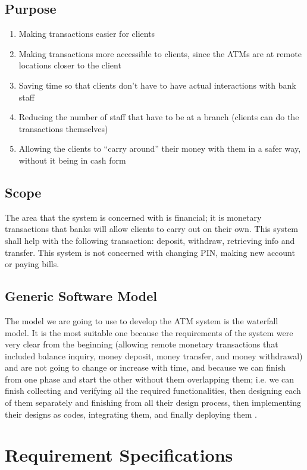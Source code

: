 \documentclass{article}
\begin{document}
	\subsection{Purpose}
		\begin{enumerate}
			\item Making transactions easier for clients
		    \item Making transactions more accessible to clients, since the ATMs are at remote locations closer to the client
		    \item Saving time so that clients don’t have to have actual interactions with bank staff
		    \item Reducing the number of staff that have to be at a branch (clients can do the transactions themselves)
		    \item Allowing the clients to “carry around” their money with them in a safer way, without it being in cash form
		\end{enumerate}
  
	\subsection{Scope}
	The area that the system is concerned with is financial; it is monetary transactions that banks will allow clients to carry out on their own. This system shall help with the following transaction: deposit, withdraw, retrieving info and transfer. This system is not concerned with changing PIN, making new account or paying bills.
	\subsection{Generic Software Model}
	The model we are going to use to develop the ATM system is the waterfall model. It is the most suitable one because the requirements of the system were very clear from the beginning (allowing remote monetary transactions that included balance inquiry, money deposit, money transfer, and money withdrawal) and are not going to change or increase with time, and because we can finish from one phase and start the other without them overlapping them; i.e. we can finish collecting and verifying all the required functionalities, then designing each of them separately and finishing from all their design process, then implementing their designs as codes, integrating them, and finally deploying them \cite{waterfall}.
	\section{Requirement Specifications}
\end{document}
